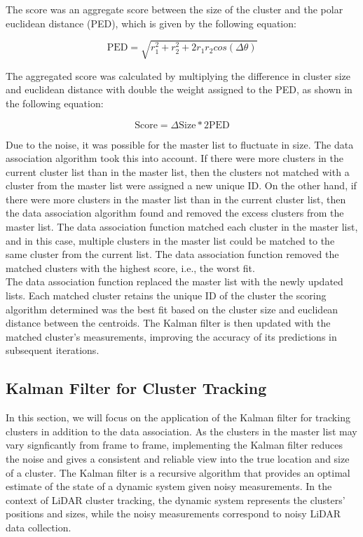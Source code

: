 \documentclass[journal]{IEEEtran} %
\begin{document}
The score was an aggregate score between the size of the cluster and the polar euclidean distance (PED), which is given by the following equation:

\[
\text{PED} = \sqrt{r_1^2 + r_2^2+2r_1r_2cos(\Delta\theta)}
\]

The aggregated score was calculated by multiplying the difference in cluster size and euclidean distance with double the weight assigned to the PED, as shown in the following equation:

\[ 
\text{Score} = \Delta \text{Size} * 2  \text{PED}
\]

Due to the noise, it was possible for the master list to fluctuate in size. The data association algorithm took this into account. If there were more clusters in the current cluster list than in the master list, then the clusters not matched with a cluster from the master list were assigned a new unique ID. On the other hand, if there were more clusters in the master list than in the current cluster list, then the data association algorithm found and removed the excess clusters from the master list. The data association function matched each cluster in the master list, and in this case, multiple clusters in the master list could be matched to the same cluster from the current list. The data association function removed the matched clusters with the highest score, i.e., the worst fit.\\

The data association function replaced the master list with the newly updated lists. Each matched cluster retains the unique ID of the cluster the scoring algorithm determined was the best fit based on the cluster size and euclidean distance between the centroids. The Kalman filter is then updated with the matched cluster's measurements, improving the accuracy of its predictions in subsequent iterations.


\subsection{Kalman Filter for Cluster Tracking}

In this section, we will focus on the application of the Kalman filter for tracking clusters in addition to the data association. As the clusters in the master list may vary signficantly from frame to frame, implementing the Kalman filter reduces the noise and gives a consistent and reliable view into the true location and size of a cluster. The Kalman filter is a recursive algorithm that provides an optimal estimate of the state of a dynamic system given noisy measurements. In the context of LiDAR cluster tracking, the dynamic system represents the clusters' positions and sizes, while the noisy measurements correspond to noisy LiDAR data collection.\\
\end{document}
